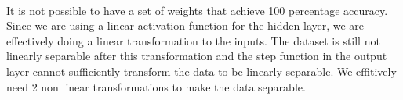 \begin{answer}\\
It is not possible to have a set of weights that achieve 100 percentage accuracy.\\
Since we are using a linear activation function for the hidden layer, we are effectively doing a linear transformation to the inputs. The dataset is still not linearly separable after this transformation and the step function in the output layer cannot sufficiently transform the data to be linearly separable. We effitively need 2 non linear transformations to make the data separable.\\
\end{answer}
